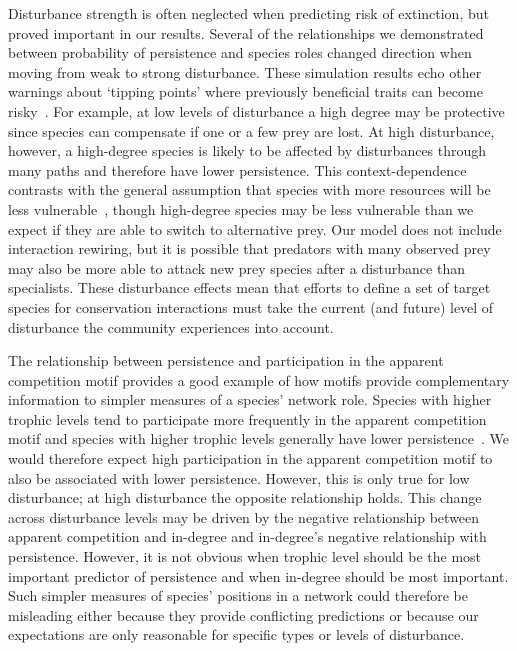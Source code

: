 \documentclass[12pt]{article}
\begin{document}
\begin{spacing}{1.0}
    Disturbance strength is often neglected when predicting risk of extinction, but proved important in our results.
    Several of the relationships we demonstrated between probability of persistence and species roles changed direction when moving from weak to strong disturbance.
    These simulation results echo other warnings about `tipping points' where previously beneficial traits can become risky~\citep{Latty2019,Golubski2016,Tylianakis2014}.
    For example, at low levels of disturbance a high degree may be protective since species can compensate if one or a few prey are lost. 
    At high disturbance, however, a high-degree species is likely to be affected by disturbances through many paths and therefore have lower persistence.
    This context-dependence contrasts with the general assumption that species with more resources will be less vulnerable~\citep{Allesina2012,binzer2011susceptibility}, though high-degree species may be less vulnerable than we expect if they are able to switch to alternative prey.
    Our model does not include interaction rewiring, but it is possible that predators with many observed prey may also be more able to attack new prey species after a disturbance than specialists.
    These disturbance effects mean that efforts to define a set of target species for conservation interactions must take the current (and future) level of disturbance the community experiences into account.
    

    The relationship between persistence and participation in the apparent competition motif provides a good example of how motifs provide complementary information to simpler measures of a species' network role.
    Species with higher trophic levels tend to participate more frequently in the apparent competition motif and
    species with higher trophic levels generally have lower persistence~\citep{Eklof2006,Eklof2013}. 
    We would therefore expect high participation in the apparent competition motif to also be associated with lower persistence.
    However, this is only true for low disturbance; at high disturbance the opposite relationship holds.
    This change across disturbance levels may be driven by the negative relationship between apparent competition and in-degree and in-degree's negative relationship with persistence.
    However, it is not obvious when trophic level should be the most important predictor of persistence and when in-degree should be most important.
    Such simpler measures of species' positions in a network could therefore be misleading either because they provide conflicting predictions or because our expectations are only reasonable for specific types or levels of disturbance.



\end{spacing}
\end{document}
